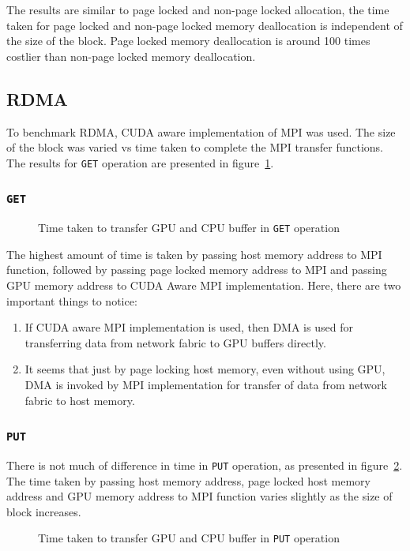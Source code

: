 The results are similar to page locked and non-page locked allocation, the time
taken for page locked and non-page locked memory deallocation is independent of
the size of the block. Page locked memory deallocation is around 100 times costlier
than non-page locked memory deallocation.

\subsection{RDMA}
To benchmark RDMA, CUDA aware implementation of MPI was used. The size of the block
was varied vs time taken to complete the MPI transfer functions. The results
for \texttt{GET} operation are presented in figure~\ref{fig:mempin_rdma_get}.

\subsubsection{\texttt{GET}}
\begin{figure}[h]
  
  \caption{Time taken to transfer GPU and CPU buffer in \texttt{GET} operation}
  \label{fig:mempin_rdma_get}
\end{figure}


The highest amount of time is taken by passing host memory address to MPI function,
followed by passing page locked memory address to MPI and passing GPU memory
address to CUDA Aware MPI implementation. Here, there are two important things to
notice:
\begin{enumerate}
\item If CUDA aware MPI implementation is used, then DMA is used for transferring
  data from network fabric to GPU buffers directly.
\item It seems that just by page locking host memory, even without using GPU, DMA
  is invoked by MPI implementation for transfer of data from network fabric to
  host memory.
\end{enumerate}

\subsubsection{\texttt{PUT}}
There is not much of difference in time in \texttt{PUT} operation, as presented
in figure~\ref{fig:mempin_rdma_put}. The time taken by passing host memory address,
page locked host memory address and GPU memory address to MPI function varies slightly
as the size of block increases.

\begin{figure}[h]
  
  \caption{Time taken to transfer GPU and CPU buffer in \texttt{PUT} operation}
  \label{fig:mempin_rdma_put}
\end{figure}

